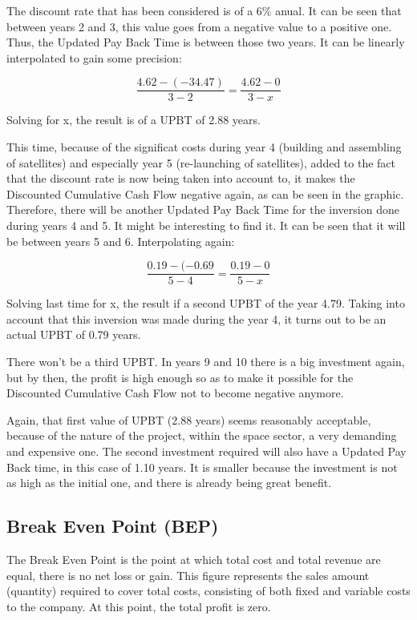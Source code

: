 The discount rate that has been considered is of a 6\% anual. It can be seen that between years 2 and 3, this value goes from a negative value to a positive one. Thus, the Updated Pay Back Time is between those two years. It can be linearly interpolated to gain some precision:

\begin{equation}
\frac{4.62-(-34.47)}{3-2}=\frac{4.62-0}{3-x}
\end{equation}

Solving for x, the result is of a UPBT of 2.88 years.

This time, because of the significat costs during year 4 (building and assembling of satellites) and especially year 5 (re-launching of satellites), added to the fact that the discount rate is now being taken into account to, it makes the Discounted Cumulative Cash Flow negative again, as can be seen in the graphic. Therefore, there will be another Updated Pay Back Time for the inversion done during years 4 and 5. It might be interesting to find it. It can be seen that it will be between years 5 and 6. Interpolating again:

\begin{equation}
\frac{0.19-(-0.69}{5-4}=\frac{0.19-0}{5-x}
\end{equation}

Solving last time for x, the result if a second UPBT of the year 4.79. Taking into account that this inversion was made during the year 4, it turns out to be an actual UPBT of 0.79 years.

There won't be a third UPBT. In years 9 and 10 there is a big investment again, but by then, the profit is high enough so as to make it possible for the Discounted Cumulative Cash Flow not to become negative anymore. 

Again, that first value of UPBT (2.88 years) seems reasonably acceptable, because of the nature of the project, within the space sector, a very demanding and expensive one. The second investment required will also have a Updated Pay Back time, in this case of 1.10 years. It is smaller because the investment is not as high as the initial one, and there is already being great benefit. 

\subsection{Break Even Point (BEP)}
The Break Even Point is the point at which total cost and total revenue are equal, there is no net loss or gain. This figure represents the sales amount (quantity) required to cover total costs, consisting of both fixed and variable costs to the company. At this point, the total profit is zero. 

